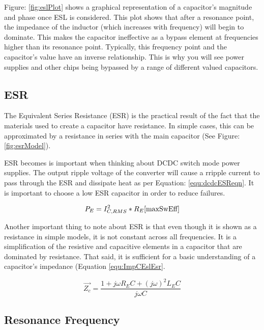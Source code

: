 Figure: \ref{fig:eslPlot} shows a graphical representation of a capacitor's magnitude and phase once ESL is considered. This plot shows that after a resonance point, the impedance of the inductor (which increases with frequency) will begin to dominate. This makes the capacitor ineffective as a bypass element at frequencies higher than its resonance point. Typically, this frequency point and the capacitor's value have an inverse relationship. This is why you will see power supplies and other chips being bypassed by a range of different valued capacitors. 

\subsection{ESR}
\label{sec:ESR}

The Equivalent Series Resistance (ESR) is the practical result of the fact that the materials used to create a capacitor have resistance. In simple cases, this can be approximated by a resistance in series with the main capacitor (See Figure: \ref{fig:esrModel}).

ESR becomes is important when thinking about DCDC switch mode power supplies. The output ripple voltage of the converter will cause a rripple current to pass through the ESR and dissipate heat as per Equation: \eqref{equ:dcdcESReqn}. It is important to choose a low ESR capacitor in order to reduce failures.

\begin{equation}
\label{equ:dcdcESReqn}
P_E = I_{C,RMS}^2 * R_E
\cite{maxSwEff}
\end{equation}

Another important thing to note about ESR is that even though it is shown as a resistance in simple models, it is not constant across all frequencies. It is a simplification of the resistive and capacitive elements in a capacitor that are dominated by resistance. That said, it is sufficient for a basic understanding of a capacitor's impedance (Equation \eqref{equ:ImpCEslEsr}.

\begin{equation}
\label{equ:ImpCEslEsr}
\vec{Z_c} = \frac{1 + j\omega R_EC + (j\omega)^2L_EC}{j\omega C}
\end{equation}

\subsection{Resonance Frequency}


